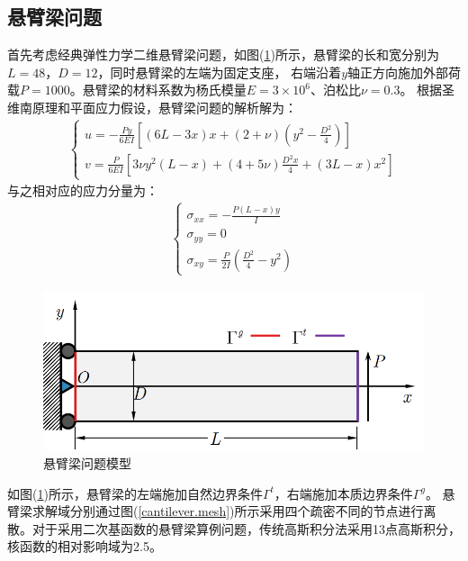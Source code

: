 \subsection{悬臂梁问题}
首先考虑经典弹性力学二维悬臂梁问题，如图(\ref{cantilever})所示，悬臂梁的长和宽分别为$L=48$，$D=12$，同时悬臂梁的左端为固定支座，
右端沿着$y$轴正方向施加外部荷载$P=1000$。悬臂梁的材料系数为杨氏模量$E=3\times10^6$、泊松比$\nu=0.3$。
根据圣维南原理和平面应力假设，悬臂梁问题的解析解为：
\begin{equation}
\begin{split}
\begin{cases}
    u = -\frac{Py}{6EI}[(6L-3x)x + (2+\nu)(y^2 - \frac{D^2}{4})] \\
    v = \frac{P}{6EI}[3\nu y^2(L-x) + (4+5\nu)\frac{D^2x}{4} + (3L-x)x^2]
\end{cases}
\end{split}
\end{equation}
与之相对应的应力分量为：
\begin{equation}
\begin{split}
\begin{cases}
   \sigma_{xx}=-\frac{P(L-x)y}{I}\\
   \sigma_{yy}=0\\
   \sigma_{xy}=\frac{P}{2I}(\frac{D^2}{4}-y^2)
\end{cases}
\end{split}
\end{equation}
\begin{figure}[H]
    \centering
    \includegraphics[scale=0.7]{figure/EHR/cantilever/cantilever.png}
    \caption{悬臂梁问题模型}\label{cantilever}
\end{figure}
如图(\ref{cantilever})所示，悬臂梁的左端施加自然边界条件$\Gamma^t$，右端施加本质边界条件$\Gamma^g$。
悬臂梁求解域分别通过图(\ref{cantilever.mesh})所示采用四个疏密不同的节点进行离散。对于采用二次基函数的悬臂梁算例问题，传统高斯积分法采用13点高斯积分，核函数的相对影响域为2.5。
\newpage
